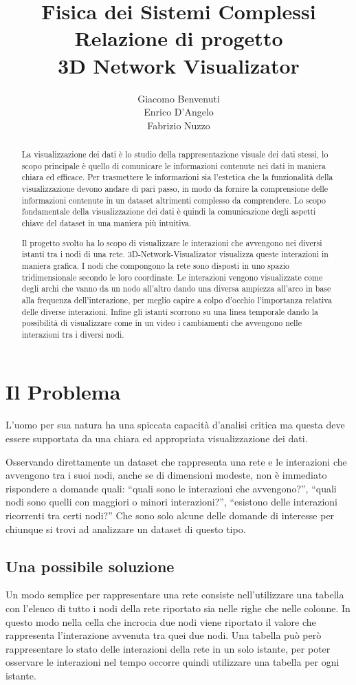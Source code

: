 \documentclass[a4paper,12pt]{article}
\title{Fisica dei Sistemi Complessi\\Relazione di progetto\\3D Network Visualizator}
\author{Giacomo Benvenuti\\Enrico D'Angelo\\Fabrizio Nuzzo}
\date{}
\begin{document}
\maketitle

\begin{abstract}
La visualizzazione dei dati \`e lo studio della rappresentazione visuale dei dati stessi, lo scopo principale \`e quello di comunicare le informazioni contenute nei dati in maniera chiara ed efficace. Per trasmettere le informazioni sia l'estetica che la funzionalità della visualizzazione devono andare di pari passo, in modo da fornire la comprensione delle informazioni contenute in un dataset altrimenti complesso da comprendere. Lo scopo fondamentale della visualizzazione dei dati \`e quindi la comunicazione degli aspetti chiave del dataset in una maniera più intuitiva.

Il progetto svolto ha lo scopo di visualizzare le interazioni che avvengono nei diversi istanti tra i nodi di una rete. 3D-Network-Visualizator visualizza queste interazioni in maniera grafica. I nodi che compongono la rete sono disposti in uno spazio tridimensionale secondo le loro coordinate. Le interazioni vengono visualizzate come degli archi che vanno da un nodo all'altro dando una diversa ampiezza all'arco in base alla frequenza dell'interazione, per meglio capire a colpo d'occhio l'importanza relativa delle diverse interazioni. Infine gli istanti scorrono su una linea temporale dando la possibilità di visualizzare come in un video i cambiamenti che avvengono nelle interazioni tra i diversi nodi.
\end{abstract}

\section{Il Problema}
L'uomo per sua natura ha una spiccata capacit\`a d'analisi critica ma questa deve essere supportata da una chiara ed appropriata visualizzazione dei dati.

Osservando direttamente un dataset che rappresenta una rete e le interazioni che avvengono tra i suoi nodi, anche se di dimensioni modeste, non \`e immediato rispondere a domande quali: “quali sono le interazioni che avvengono?”, “quali nodi sono quelli con maggiori o minori interazioni?”, “esistono delle interazioni ricorrenti tra certi nodi?” Che sono solo alcune delle domande di interesse per chiunque si trovi ad analizzare un dataset di questo tipo.

\subsection{Una possibile soluzione}
Un modo semplice per rappresentare una rete consiste nell'utilizzare una tabella con l'elenco di tutto i nodi della rete riportato sia nelle righe che nelle colonne. In questo modo nella cella che incrocia due nodi viene riportato il valore che rappresenta l'interazione avvenuta tra quei due nodi. Una tabella pu\`o per\`o rappresentare lo stato delle interazioni della rete in un solo istante, per poter osservare le interazioni nel tempo occorre quindi utilizzare una tabella per ogni istante.
\end{document}
